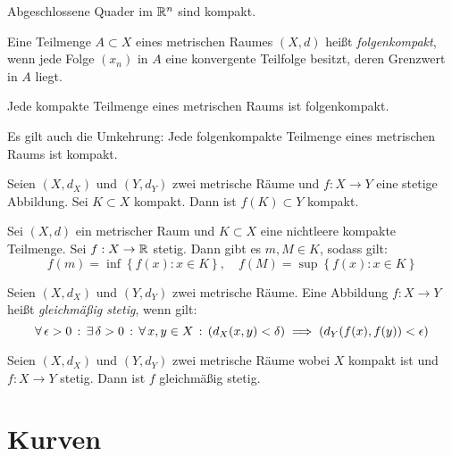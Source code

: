 \documentclass{cheat-sheet}
\begin{document}
\begin{satz}
  Abgeschlossene Quader im $\mathbb{R}^n$ sind kompakt.
\end{satz}

\begin{defn}
  Eine Teilmenge $A \subset X$ eines metrischen Raumes $(X, d)$ heißt \emph{folgenkompakt}, wenn jede Folge $(x_n)$ in $A$ eine konvergente Teilfolge besitzt, deren Grenzwert in $A$ liegt.
\end{defn}

\begin{satz}
  Jede kompakte Teilmenge eines metrischen Raums ist folgenkompakt.
\end{satz}

\begin{bem}
  Es gilt auch die Umkehrung: Jede folgenkompakte Teilmenge eines metrischen Raums ist kompakt.
\end{bem}

\begin{satz}
  Seien $(X, d_X)$ und $(Y, d_Y)$ zwei metrische Räume und $f : X \to Y$ eine stetige Abbildung. Sei $K \subset X$ kompakt. Dann ist $f(K) \subset Y$ kompakt.
\end{satz}

\begin{satz}
  Sei $(X, d)$ ein metrischer Raum und $K \subset X$ eine nichtleere kompakte Teilmenge. Sei $f : X \to \mathbb{R}$ stetig. Dann gibt es $m, M \in K$, sodass gilt:
  \[ f(m) = \inf\left\{ f(x) : x \in K \right\},\quad f(M) = \sup\left\{ f(x) : x \in K \right\} \]
\end{satz}

\begin{defn}
  Seien $(X, d_X)$ und $(Y, d_Y)$ zwei metrische Räume. Eine Abbildung $f : X \to Y$ heißt \emph{gleichmäßig stetig}, wenn gilt:
  \[ \forall \, {\epsilon > 0} \,:\, \exists \, {\delta > 0} \,:\, \forall \, {x, y \in X} \,:\, \left(d_X(x, y) < \delta\right) \implies \left( d_Y(f(x), f(y)) < \epsilon \right) \]
\end{defn}

\begin{samepage} %

\begin{satz}
  Seien $(X, d_X)$ und $(Y, d_Y)$ zwei metrische Räume wobei $X$ kompakt ist und $f : X \to Y$ stetig. Dann ist $f$ gleichmäßig stetig.
\end{satz}

\section{Kurven}

\end{samepage}
\end{document}
